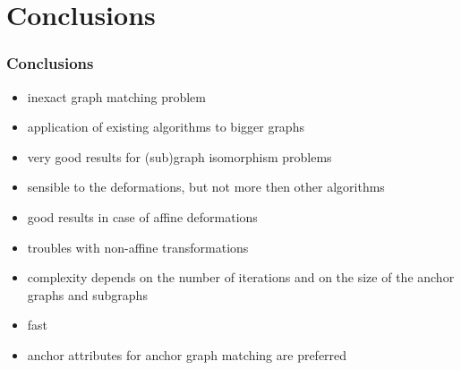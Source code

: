 \documentclass[hyperref={pdfpagelabels=false}]{beamer}
\begin{document}
\section{Conclusions}
\begin{frame} %
\frametitle{Conclusions}
	\begin{itemize}
		\item inexact graph matching problem
		\item application of existing algorithms to bigger graphs
		\item very good results for (sub)graph isomorphism problems
		\item sensible to the deformations, but not more then other algorithms
		\item good results in case of affine deformations
		\item troubles with non-affine transformations
		\item complexity depends on the number of iterations and on the size of the anchor graphs and subgraphs
		\item fast
		\item anchor attributes for anchor graph matching are preferred
	\end{itemize}
\end{frame}
\end{document}
